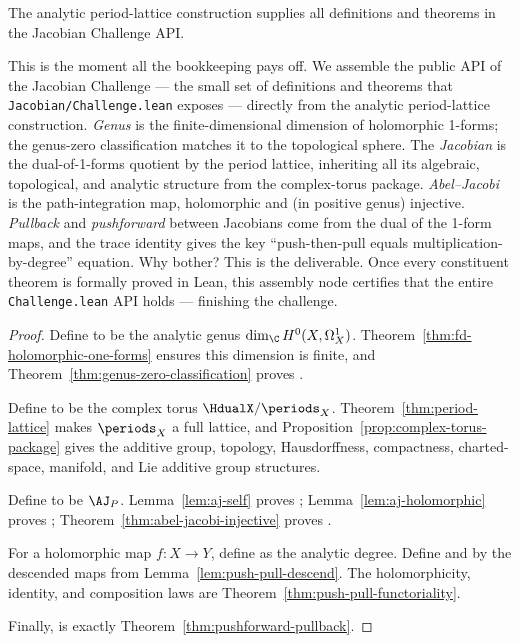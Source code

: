 \begin{theorem}
\label{thm:challenge-api}
The analytic period-lattice construction supplies all definitions and theorems
in the Jacobian Challenge API.
\leanok
\end{theorem}

\begin{layman}
This is the moment all the bookkeeping pays off. We assemble the public
API of the Jacobian Challenge — the small set of definitions and
theorems that \texttt{Jacobian/Challenge.lean} exposes — directly from
the analytic period-lattice construction. \emph{Genus} is the
finite-dimensional dimension of holomorphic 1-forms; the genus-zero
classification matches it to the topological sphere. The
\emph{Jacobian} is the dual-of-1-forms quotient by the period lattice,
inheriting all its algebraic, topological, and analytic structure from
the complex-torus package. \emph{Abel–Jacobi} is the path-integration
map, holomorphic and (in positive genus) injective. \emph{Pullback}
and \emph{pushforward} between Jacobians come from the dual of the
1-form maps, and the trace identity gives the key
``push-then-pull equals multiplication-by-degree'' equation. Why
bother? This is the deliverable. Once every constituent theorem is
formally proved in Lean, this assembly node certifies that the entire
\texttt{Challenge.lean} API holds — finishing the challenge.
\end{layman}

\begin{proof}
Define  to be the analytic genus
\(\dim_{\C}H^{0}(X,\Omega^{1}_{X})\). Theorem~\ref{thm:fd-holomorphic-one-forms}
ensures this dimension is finite, and Theorem~\ref{thm:genus-zero-classification}
proves .

Define  to be the complex torus
\(\HdualX/\periods_X\). Theorem~\ref{thm:period-lattice} makes
\(\periods_X\) a full lattice, and Proposition~\ref{prop:complex-torus-package}
gives the additive group, topology, Hausdorffness, compactness, charted-space,
manifold, and Lie additive group structures.

Define  to be \(\AJ_P\). Lemma~\ref{lem:aj-self}
proves ; Lemma~\ref{lem:aj-holomorphic} proves
; Theorem~\ref{thm:abel-jacobi-injective} proves
.

For a holomorphic map \(f:X\to Y\), define  as
the analytic degree. Define  and
 by the descended maps from
Lemma~\ref{lem:push-pull-descend}. The holomorphicity, identity, and
composition laws are Theorem~\ref{thm:push-pull-functoriality}.

Finally,  is exactly
Theorem~\ref{thm:pushforward-pullback}.
\end{proof}
